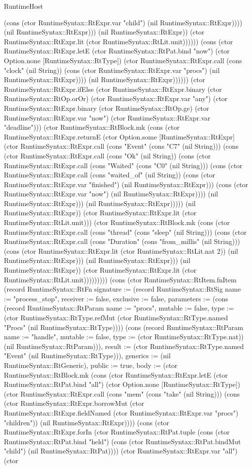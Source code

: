 \begin{lexlean}{RuntimeHost}
\begin{semanticmodule}
{(cons (ctor RuntimeSyntax::RtExpr.var "child") (nil RuntimeSyntax::RtExpr)))) (nil RuntimeSyntax::RtExpr))) (nil RuntimeSyntax::RtExpr)) (ctor RuntimeSyntax::RtExpr.lit (ctor RuntimeSyntax::RtLit.unit)))))) (cons (ctor RuntimeSyntax::RtExpr.letE (ctor RuntimeSyntax::RtPat.bind "now") (ctor Option.none [RuntimeSyntax::RtType]) (ctor RuntimeSyntax::RtExpr.call (cons "clock" (nil String)) (cons (ctor RuntimeSyntax::RtExpr.var "procs") (nil RuntimeSyntax::RtExpr)))) (nil RuntimeSyntax::RtExpr)))))) (ctor RuntimeSyntax::RtExpr.ifElse (ctor RuntimeSyntax::RtExpr.binary (ctor RuntimeSyntax::RtOp.orOr) (ctor RuntimeSyntax::RtExpr.var "any") (ctor RuntimeSyntax::RtExpr.binary (ctor RuntimeSyntax::RtOp.ge) (ctor RuntimeSyntax::RtExpr.var "now") (ctor RuntimeSyntax::RtExpr.var "deadline"))) (ctor RuntimeSyntax::RtBlock.mk (cons (ctor RuntimeSyntax::RtExpr.returnE (ctor Option.some [RuntimeSyntax::RtExpr] (ctor RuntimeSyntax::RtExpr.call (cons "Event" (cons "C7" (nil String))) (cons (ctor RuntimeSyntax::RtExpr.call (cons "Ok" (nil String)) (cons (ctor RuntimeSyntax::RtExpr.call (cons "Waited" (cons "C0" (nil String))) (cons (ctor RuntimeSyntax::RtExpr.call (cons "waited_of" (nil String)) (cons (ctor RuntimeSyntax::RtExpr.var "finished") (nil RuntimeSyntax::RtExpr))) (cons (ctor RuntimeSyntax::RtExpr.var "now") (nil RuntimeSyntax::RtExpr)))) (nil RuntimeSyntax::RtExpr))) (nil RuntimeSyntax::RtExpr))))) (nil RuntimeSyntax::RtExpr)) (ctor RuntimeSyntax::RtExpr.lit (ctor RuntimeSyntax::RtLit.unit))) (ctor RuntimeSyntax::RtBlock.mk (cons (ctor RuntimeSyntax::RtExpr.call (cons "thread" (cons "sleep" (nil String))) (cons (ctor RuntimeSyntax::RtExpr.call (cons "Duration" (cons "from_millis" (nil String))) (cons (ctor RuntimeSyntax::RtExpr.lit (ctor RuntimeSyntax::RtLit.nat 2)) (nil RuntimeSyntax::RtExpr))) (nil RuntimeSyntax::RtExpr))) (nil RuntimeSyntax::RtExpr)) (ctor RuntimeSyntax::RtExpr.lit (ctor RuntimeSyntax::RtLit.unit)))))))})) (cons (ctor RuntimeSyntax::RtItem.fnItem (record RuntimeSyntax::RtFn {signature := (record RuntimeSyntax::RtSig {name := "process_stop", receiver := false, exclusive := false, parameters := (cons (record RuntimeSyntax::RtParam {name := "procs", mutable := false, type := (ctor RuntimeSyntax::RtType.refMut (ctor RuntimeSyntax::RtType.named "Procs" (nil RuntimeSyntax::RtType)))}) (cons (record RuntimeSyntax::RtParam {name := "handle", mutable := false, type := (ctor RuntimeSyntax::RtType.nat)}) (nil RuntimeSyntax::RtParam))), result := (ctor RuntimeSyntax::RtType.named "Event" (nil RuntimeSyntax::RtType))}), generics := (nil RuntimeSyntax::RtGeneric), public := true, body := (ctor RuntimeSyntax::RtBlock.mk (cons (ctor RuntimeSyntax::RtExpr.letE (ctor RuntimeSyntax::RtPat.bind "all") (ctor Option.none [RuntimeSyntax::RtType]) (ctor RuntimeSyntax::RtExpr.call (cons "mem" (cons "take" (nil String))) (cons (ctor RuntimeSyntax::RtExpr.borrowMut (ctor RuntimeSyntax::RtExpr.fieldNamed (ctor RuntimeSyntax::RtExpr.var "procs") "children")) (nil RuntimeSyntax::RtExpr)))) (cons (ctor RuntimeSyntax::RtExpr.forIn (ctor RuntimeSyntax::RtPat.tuple (cons (ctor RuntimeSyntax::RtPat.bind "held") (cons (ctor RuntimeSyntax::RtPat.bindMut "child") (nil RuntimeSyntax::RtPat)))) (ctor RuntimeSyntax::RtExpr.var "all") (ctor }
\end{semanticmodule}
\end{lexlean}
